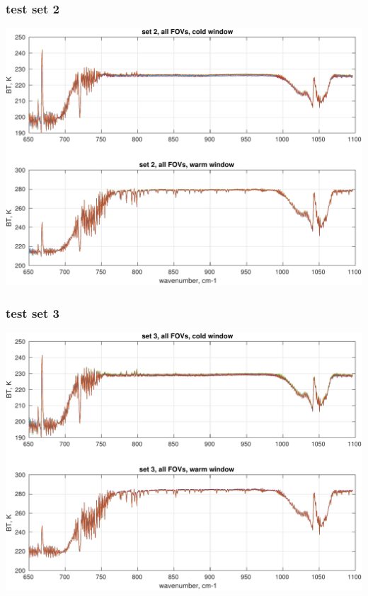 \documentclass[11pt]{beamer}
\begin{document}
\begin{frame}
\frametitle{test set 2}
\begin{center}
  \includegraphics[scale=0.5]{figures/set2_all.pdf}
\end{center}
\end{frame}
\begin{frame}
\frametitle{test set 3}
\begin{center}
  \includegraphics[scale=0.5]{figures/set3_all.pdf}
\end{center}
\end{frame}
\end{document}
